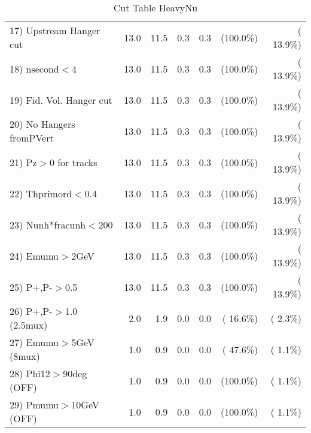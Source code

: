 \begin{table}[h!]
\begin{tabular}{||l||r|r|r|r|r|r||}
 17) Upstream Hanger cut  &         13.0 &         11.5 &          0.3 &          0.3 & (100.0\%) & ( 13.9\%) \\
 18) nsecond$<$4          &         13.0 &         11.5 &          0.3 &          0.3 & (100.0\%) & ( 13.9\%) \\
 19) Fid. Vol. Hanger cut &         13.0 &         11.5 &          0.3 &          0.3 & (100.0\%) & ( 13.9\%) \\
 20) No Hangers fromPVert &         13.0 &         11.5 &          0.3 &          0.3 & (100.0\%) & ( 13.9\%) \\
 21) Pz$>$0 for tracks    &         13.0 &         11.5 &          0.3 &          0.3 & (100.0\%) & ( 13.9\%) \\
 22) Thprimord$<$0.4      &         13.0 &         11.5 &          0.3 &          0.3 & (100.0\%) & ( 13.9\%) \\
 23) Nunh*fracunh$<$200   &         13.0 &         11.5 &          0.3 &          0.3 & (100.0\%) & ( 13.9\%) \\
 24) Emumu$>$2GeV         &         13.0 &         11.5 &          0.3 &          0.3 & (100.0\%) & ( 13.9\%) \\
 25) P+,P-$>$0.5          &         13.0 &         11.5 &          0.3 &          0.3 & (100.0\%) & ( 13.9\%) \\
 26) P+,P-$>$1.0 (2.5mux) &          2.0 &          1.9 &          0.0 &          0.0 & ( 16.6\%) & (  2.3\%) \\
 27) Emumu$>$5GeV  (8mux) &          1.0 &          0.9 &          0.0 &          0.0 & ( 47.6\%) & (  1.1\%) \\
 28) Phi12$>$90deg  (OFF) &          1.0 &          0.9 &          0.0 &          0.0 & (100.0\%) & (  1.1\%) \\
 29) Pmumu$>$10GeV  (OFF) &          1.0 &          0.9 &          0.0 &          0.0 & (100.0\%) & (  1.1\%) \\
 \hline
 \hline
 \end{tabular}
 \caption{Cut Table  HeavyNu  }
 \label{tab-cutheavy_neutrino}
 \end{table}
